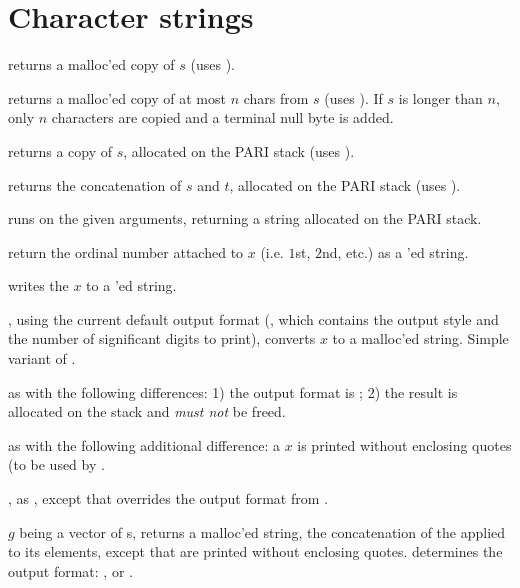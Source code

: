 \section{Character strings}


 returns a malloc'ed copy of $s$
(uses ).

 returns a malloc'ed copy of
at most $n$ chars from $s$ (uses ). If $s$ is longer than
$n$, only $n$ characters are copied and a terminal null byte is added.

 returns a copy of $s$, allocated
on the PARI stack (uses ).

 returns the
concatenation of $s$ and $t$, allocated on the PARI stack (uses
).

 runs 
on the given arguments, returning a string allocated on the PARI stack.

 return the ordinal number attached to $x$
(i.e. $1$st, $2$nd, etc.) as a  'ed string.

 writes the  $x$ to a 'ed
string.

, using the current default output format
(, which contains the output style and the number of
significant digits to print), converts $x$ to a malloc'ed string. Simple
variant of .

 as  with the following
differences: 1) the output format is ; 2) the result is allocated
on the stack and \emph{must not} be freed.

 as  with the following
additional difference: a  $x$ is printed without enclosing quotes
(to be used by .

, as , except that
 overrides the output format from .

 $g$ being a vector of s,
returns a malloc'ed string, the concatenation of the  applied
to its elements, except that  are printed without enclosing quotes.
 determines the output format: , 
or .


